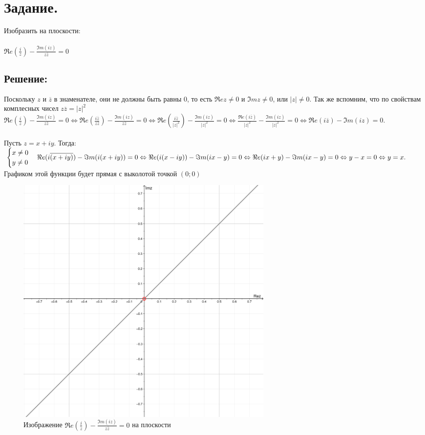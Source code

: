 \documentclass[12pt, a4paper]{article}
\begin{document}
\section{Задание.}
    Изобразить на плоскости:\\\\
    $\Re e(\frac{i}{z}) - \frac{\Im m(iz)}{z\overline{z}} = 0$
    \subsection*{Решение:}
    Поскольку $z$ и $\overline{z}$ в знаменателе, они не должны быть равны 0,
    то есть $\Re ez \neq 0$ и $\Im mz \neq 0$, или $|z| \neq 0$.\newline
    Так же вспомним, что по свойствам комплесных чисел $z\overline{z} = |z|^2$\newline
    \begin{math} 
        \Re e(\frac{i}{z}) - \frac{\Im m(iz)}{z\overline{z}} = 0 \Leftrightarrow
        \Re e(\frac{i\overline{z}}{z\overline{z}}) - \frac{\Im m(iz)}{z\overline{z}} = 0 \Leftrightarrow
        \Re e(\frac{i\overline{z}}{|z|^2}) - \frac{\Im m(iz)}{|z|^2} = 0 \Leftrightarrow
        \frac{\Re e(i\overline{z})}{|z|^2} - \frac{\Im m(iz)}{|z|^2} = 0 \Leftrightarrow
        \Re e(i\overline{z}) - \Im m(iz) = 0.
    \end{math} \\\\
    Пусть $z = x + iy$. Тогда:\\
    \begin{math}
        \begin{cases}
            x \neq 0\\
            y \neq 0
        \end{cases}\\
        \Re e(i\overline{(x + iy)}) - \Im m(i(x + iy)) = 0 \Leftrightarrow
        \Re e(i(x - iy)) - \Im m(ix - y) = 0 \Leftrightarrow
        \Re e(ix + y) - \Im m(ix - y) = 0 \Leftrightarrow
        y - x = 0 \Leftrightarrow
        y = x.
    \end{math}\\
    Графиком этой функции будет прямая с выколотой точкой $(0;0)$
    \begin{figure}[h]
        \centering
        \includegraphics[width=0.63\textwidth]{task2-a.png}
        \caption{Изображение $\Re e(\frac{i}{z}) - \frac{\Im m(iz)}{z\overline{z}} = 0$ на плоскости}
    \end{figure}
\end{document}
